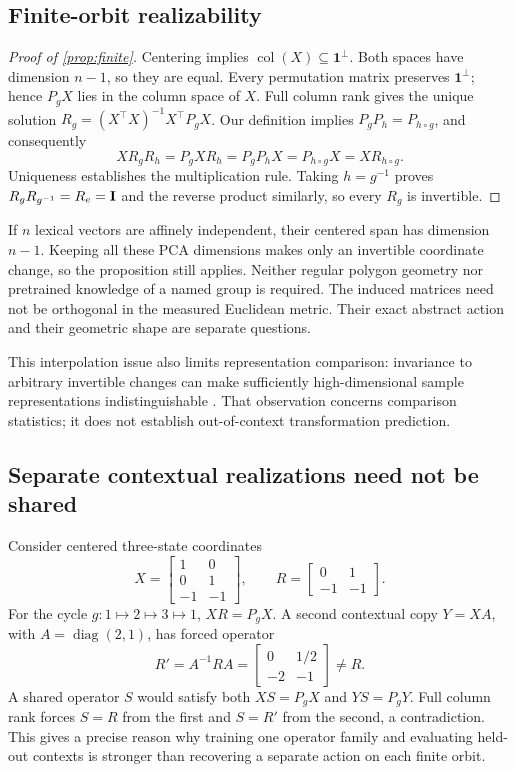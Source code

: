 \subsection{Finite-orbit realizability}
\begin{proof}[Proof of \cref{prop:finite}]
Centering implies $\operatorname{col}(X)\subseteq\mathbf{1}^{\perp}$. Both spaces have dimension $n-1$, so they are equal. Every permutation matrix preserves $\mathbf{1}^{\perp}$; hence $P_gX$ lies in the column space of $X$. Full column rank gives the unique solution $R_g=(X^\top X)^{-1}X^\top P_gX$. Our definition implies $P_gP_h=P_{h\circ g}$, and consequently
\[
 XR_gR_h=P_gXR_h=P_gP_hX=P_{h\circ g}X=XR_{h\circ g}.
\]
Uniqueness establishes the multiplication rule. Taking $h=g^{-1}$ proves $R_gR_{g^{-1}}=R_e=\mathbf{I}$ and the reverse product similarly, so every $R_g$ is invertible.
\end{proof}
If $n$ lexical vectors are affinely independent, their centered span has dimension $n-1$. Keeping all these PCA dimensions makes only an invertible coordinate change, so the proposition still applies. Neither regular polygon geometry nor pretrained knowledge of a named group is required. The induced matrices need not be orthogonal in the measured Euclidean metric. Their exact abstract action and their geometric shape are separate questions.

This interpolation issue also limits representation comparison: invariance to arbitrary invertible changes can make sufficiently high-dimensional sample representations indistinguishable \citep{kornblith2019similarity}. That observation concerns comparison statistics; it does not establish out-of-context transformation prediction.

\subsection{Separate contextual realizations need not be shared}
Consider centered three-state coordinates
\[
 X=\begin{bmatrix}1&0\\0&1\\-1&-1\end{bmatrix},\qquad
 R=\begin{bmatrix}0&1\\-1&-1\end{bmatrix}.
\]
For the cycle $g:1\mapsto2\mapsto3\mapsto1$, $XR=P_gX$. A second contextual copy $Y=XA$, with $A=\operatorname{diag}(2,1)$, has forced operator
\[
 R'=A^{-1}RA=\begin{bmatrix}0&1/2\\-2&-1\end{bmatrix}\ne R.
\]
A shared operator $S$ would satisfy both $XS=P_gX$ and $YS=P_gY$. Full column rank forces $S=R$ from the first and $S=R'$ from the second, a contradiction. This gives a precise reason why training one operator family and evaluating held-out contexts is stronger than recovering a separate action on each finite orbit.

